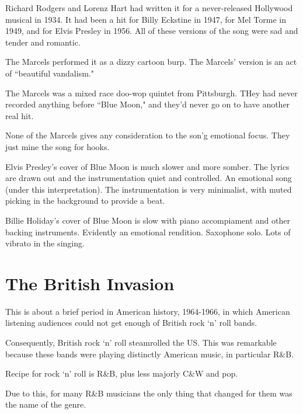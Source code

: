 \documentclass[12pt, a4paper, twoside, openright, titlepage]{book}
\begin{document}
Richard Rodgers and Lorenz Hart had written it for a never-released Hollywood musical in 1934. It had been a hit for Billy Eckstine in 1947, for Mel Torme in 1949, and for Elvis Presley in 1956. All of these versions of the song were sad and tender and romantic.

The Marcels performed it as a dizzy cartoon burp. The Marcels' version is an act of ``beautiful vandalism."

\begin{rmk}{}{}
    The Marcels was a mixed race doo-wop quintet from Pittsburgh. THey had never recorded anything before ``Blue Moon," and they'd never go on to have another real hit.
\end{rmk}

None of the Marcels gives any consideration to the son'g emotional focus. They just mine the song for hooks.


Elvis Presley's cover of Blue Moon is much slower and more somber. The lyrics are drawn out and the instrumentation quiet and controlled. An emotional song (under this interpretation). The instrumentation is very minimalist, with muted picking in the background to provide a beat.


Billie Holiday's cover of Blue Moon is slow with piano accompiament and other backing instruments. Evidently an emotional rendition. Saxophone solo. Lots of vibrato in the singing.





\chapter{The British Invasion}



\begin{rmk}{}{}
    This is about a brief period in American history, 1964-1966, in which American listening audiences could not get enough of British rock `n' roll bands.


    Consequently, British rock `n' roll steamrolled the US. This was remarkable because these bands were playing distinctly American music, in particular R\&B.
\end{rmk}

\begin{rec}{}{}
    Recipe for rock `n' roll is R\&B, plus less majorly C\&W and pop. 

    Due to this, for many R\&B musicians the only thing that changed for them was the name of the genre.
\end{rec}
\end{document}
